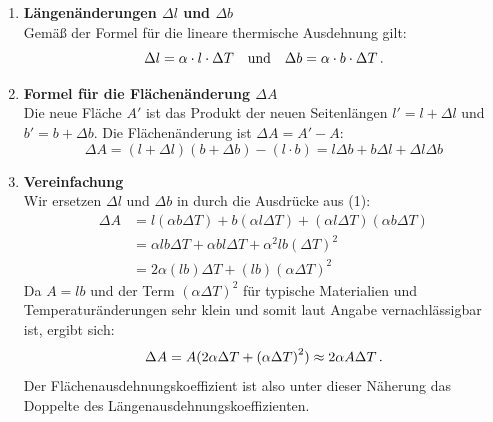 \documentclass[ngerman]{scrreprt}
\newenvironment{loesungbox}[1]
  {\needspace{5\baselineskip}\begin{loesungboxstyle}[frametitle={#1}]}
  {\end{loesungboxstyle}}
\begin{document}
\begin{loesungbox}{Lösung zu \Cref{aufg:thermische_ausdehnung_flaeche}}
\begin{enumerate}
    \item \textbf{Längenänderungen $\Delta l$ und $\Delta b$} \\
    Gemäß der Formel für die lineare thermische Ausdehnung gilt:
    \begin{equation}
        \Delta l = \alpha \cdot l \cdot \Delta T \quad \text{und} \quad \Delta b = \alpha \cdot b \cdot \Delta T \,.
    \end{equation}

    \item \textbf{Formel für die Flächenänderung $\Delta A$} \\
    Die neue Fläche $A'$ ist das Produkt der neuen Seitenlängen $l' = l + \Delta l$ und $b' = b + \Delta b$. Die Flächenänderung ist $\Delta A = A' - A$:
    \begin{equation}\label{eq: delta_A_exact}
        \Delta A = (l + \Delta l)(b + \Delta b) - (l\cdot b) = l \Delta b + b \Delta l + \Delta l \Delta b
    \end{equation}

    \item \textbf{Vereinfachung} \\
    Wir ersetzen $\Delta l$ und $\Delta b$ in  durch die Ausdrücke aus (1):
    \begin{align}
        \Delta A &= l (\alpha b \Delta T) + b (\alpha l \Delta T) + (\alpha l \Delta T)(\alpha b \Delta T) \nonumber \\
        &= \alpha l b \Delta T + \alpha b l \Delta T + \alpha^2 l b (\Delta T)^2 \nonumber \\
        &= 2\alpha (l b) \Delta T + (l b) {(\alpha \Delta T)}^2
    \end{align}
    Da $A = l b$ und der Term ${(\alpha \Delta T)}^2$ für typische Materialien und Temperaturänderungen sehr klein und somit laut Angabe vernachlässigbar ist, ergibt sich:
    \begin{equation}\label{eq: delta_A_approx}
        \Delta A = A(2\alpha \Delta T + {(\alpha\Delta T)}^2) \approx 2\alpha A \Delta T \,.
    \end{equation}
    Der Flächenausdehnungskoeffizient ist also unter dieser Näherung das Doppelte des Längenausdehnungskoeffizienten.


\end{enumerate}
\end{loesungbox}
\end{document}
